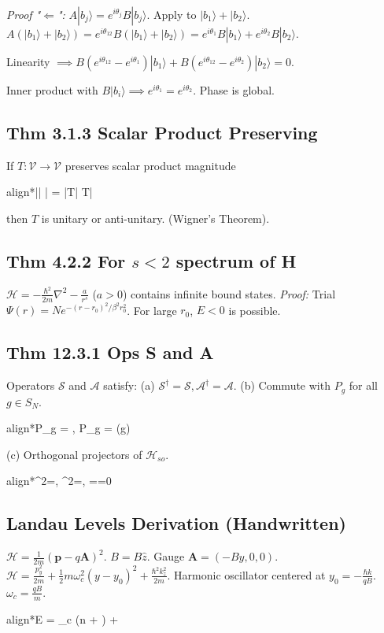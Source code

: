 \documentclass[10pt,a4paper]{article}
\newcommand{\important}[1]{\begin{empheq}[box=\fbox]{align*}#1\end{empheq}}
\begin{document}
\begin{multicols*}{3}
\textit{Proof "$\Leftarrow$":} $A|b_j\rangle = e^{i\theta_j} B|b_j\rangle$. 
Apply to $|b_1\rangle + |b_2\rangle$.
$A(|b_1\rangle+|b_2\rangle) = e^{i\theta_{12}} B(|b_1\rangle+|b_2\rangle) = e^{i\theta_1} B|b_1\rangle + e^{i\theta_2} B|b_2\rangle$.

Linearity $\implies B(e^{i\theta_{12}} - e^{i\theta_1})|b_1\rangle + B(e^{i\theta_{12}} - e^{i\theta_2})|b_2\rangle = 0$.

Inner product with $B|b_i\rangle \implies e^{i\theta_1} = e^{i\theta_2}$. Phase is global.

\subsection*{Thm 3.1.3 Scalar Product Preserving}
If $T: \mathcal{V} \to \mathcal{V}$ preserves scalar product magnitude
\important{|\langle \phi | \psi \rangle| = |\langle T\phi | T\psi \rangle|}
then $T$ is unitary or anti-unitary. (Wigner's Theorem).

\subsection*{Thm 4.2.2 For $s<2$ spectrum of H}
$\mathcal{H} = -\frac{\hbar^2}{2m}\nabla^2 - \frac{a}{r^s}$ ($a>0$) contains infinite bound states.
\textit{Proof:} Trial $\Psi(r) = N e^{-(r-r_0)^2/\beta^2 r_0^2}$.
For large $r_0$, $E < 0$ is possible.






\subsection*{Thm 12.3.1 Ops S and A}
Operators $\mathcal{S}$ and $\mathcal{A}$ satisfy:
(a) $\mathcal{S}^\dagger = \mathcal{S}, \mathcal{A}^\dagger = $.
(b) Commute with $P_g$ for all $g \in S_N$.
\important{P_g  = \mathcal{S}, \quad P_g \mathcal{A} = \text{sign}(g) }
(c) Orthogonal projectors of $\mathcal{H}_{so}$.
\important{^2=\mathcal{S}, \quad \mathcal{A}^2=\mathcal{A}, \quad \mathcal{S}\mathcal{A}=\mathcal{A}\mathcal{S}=0}

\subsection*{Landau Levels Derivation (Handwritten)}
$\mathcal{H} = \frac{1}{2m}(\mathbf{p} - q\mathbf{A})^2$. $B = B\hat{z}$. Gauge $\mathbf{A} = (-By, 0, 0)$.
$\mathcal{H} = \frac{p_y^2}{2m} + \frac{1}{2}m \omega_c^2 (y - y_0)^2 + \frac{\hbar^2 k_z^2}{2m}$.
Harmonic oscillator centered at $y_0 = -\frac{\hbar k}{qB}$. $\omega_c = \frac{qB}{m}$.
\important{E = \hbar\omega_c (n + ) + \frac{\hbar^2 k_z^2}{2m}}

\end{multicols*}
\end{document}
